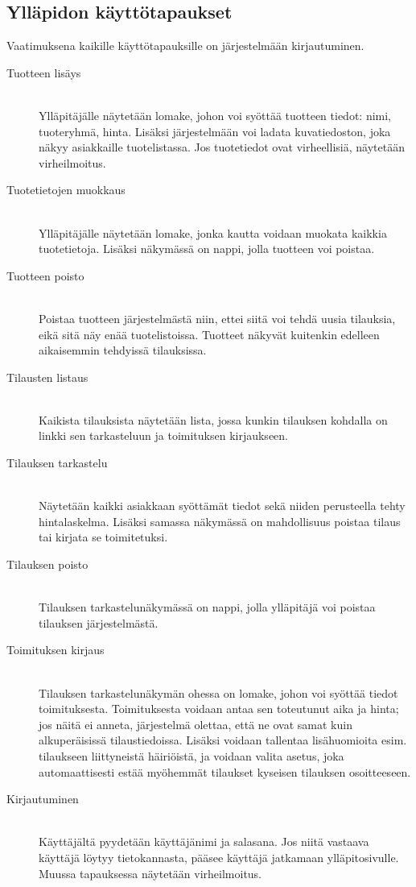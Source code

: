 \documentclass[a4paper, 12pt, finnish]{article}
\begin{document}
\subsection*{Ylläpidon käyttötapaukset}
Vaatimuksena kaikille käyttötapauksille on järjestelmään kirjautuminen.
\begin{description}
\item[Tuotteen lisäys]\mbox{}\\
Ylläpitäjälle näytetään lomake, johon voi syöttää tuotteen tiedot: nimi, tuoteryhmä, hinta. Lisäksi järjestelmään voi ladata kuvatiedoston, joka näkyy asiakkaille tuotelistassa. Jos tuotetiedot ovat virheellisiä, näytetään virheilmoitus.
\item[Tuotetietojen muokkaus]\mbox{}\\
Ylläpitäjälle näytetään lomake, jonka kautta voidaan muokata kaikkia tuotetietoja. Lisäksi näkymässä on nappi, jolla tuotteen voi poistaa.
\item[Tuotteen poisto]\mbox{}\\
Poistaa tuotteen järjestelmästä niin, ettei siitä voi tehdä uusia tilauksia, eikä sitä näy enää tuotelistoissa. Tuotteet näkyvät kuitenkin edelleen aikaisemmin tehdyissä tilauksissa.
\item[Tilausten listaus]\mbox{}\\
Kaikista tilauksista näytetään lista, jossa kunkin tilauksen kohdalla on linkki sen tarkasteluun ja toimituksen kirjaukseen.
\item[Tilauksen tarkastelu]\mbox{}\\
Näytetään kaikki asiakkaan syöttämät tiedot sekä niiden perusteella tehty hintalaskelma. Lisäksi samassa näkymässä on mahdollisuus poistaa tilaus tai kirjata se toimitetuksi.
\item[Tilauksen poisto]\mbox{}\\
Tilauksen tarkastelunäkymässä on nappi, jolla ylläpitäjä voi poistaa tilauksen järjestelmästä.
\item[Toimituksen kirjaus]\mbox{}\\
Tilauksen tarkastelunäkymän ohessa on lomake, johon voi syöttää tiedot toimituksesta. Toimituksesta voidaan antaa sen toteutunut aika ja hinta; jos näitä ei anneta, järjestelmä olettaa, että ne ovat samat kuin alkuperäisissä tilaustiedoissa. Lisäksi voidaan tallentaa lisähuomioita esim. tilaukseen liittyneistä häiriöistä, ja voidaan valita asetus, joka automaattisesti estää myöhemmät tilaukset kyseisen tilauksen osoitteeseen.
\item[Kirjautuminen]\mbox{}\\
Käyttäjältä pyydetään käyttäjänimi ja salasana. Jos niitä vastaava käyttäjä löytyy tietokannasta, pääsee käyttäjä jatkamaan ylläpitosivulle. Muussa tapauksessa näytetään virheilmoitus.
\end{description}
\end{document}
